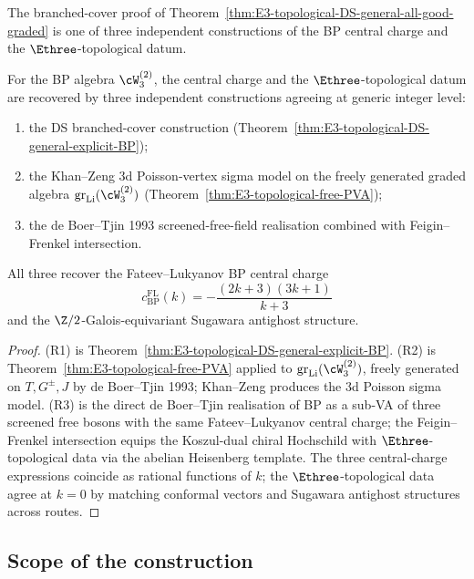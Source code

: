 The branched-cover proof of
Theorem~\ref{thm:E3-topological-DS-general-all-good-graded} is one of
three independent constructions of the BP central charge and the
$\Ethree$-topological datum.

\begin{proposition}
\label{prop:three-lane-fractional-ghost}
\ClaimStatusProvedHere{}

For the BP algebra $\cW_{3}^{(2)}$, the central charge and the
$\Ethree$-topological datum are recovered by three independent
constructions agreeing at generic integer level:
\begin{enumerate}[label=\textup{(R\arabic*)},nosep]
\item the DS branched-cover construction
 \textup{(}Theorem~\ref{thm:E3-topological-DS-general-explicit-BP}\textup{)};
\item the Khan--Zeng $3$d Poisson-vertex sigma model on the freely
 generated graded algebra
 $\operatorname{gr}_{\mathrm{Li}}(\cW_{3}^{(2)})$
 \textup{(}Theorem~\ref{thm:E3-topological-free-PVA}\textup{)};
\item the de Boer--Tjin 1993 screened-free-field realisation
 combined with Feigin--Frenkel intersection.
\end{enumerate}
All three recover the Fateev--Lukyanov BP central charge
\[
c^{\mathrm{FL}}_{\mathrm{BP}}(k)
=-\frac{(2k+3)(3k+1)}{k+3}
\]
and the
$\Z/2$-Galois-equivariant Sugawara antighost structure.
\end{proposition}

\begin{proof}
(R1) is Theorem~\ref{thm:E3-topological-DS-general-explicit-BP}.
(R2) is Theorem~\ref{thm:E3-topological-free-PVA} applied to
$\operatorname{gr}_{\mathrm{Li}}(\cW_{3}^{(2)})$, freely generated on
$T, G^{\pm}, J$ by de Boer--Tjin 1993; Khan--Zeng produces the 3d
Poisson sigma model. (R3) is the direct de Boer--Tjin realisation of
BP as a sub-VA of three screened free bosons with the same
Fateev--Lukyanov central charge; the Feigin--Frenkel intersection equips the Koszul-dual
chiral Hochschild with $\Ethree$-topological data via the abelian
Heisenberg template. The three central-charge expressions coincide
as rational functions of \(k\); the $\Ethree$-topological data agree at $k = 0$ by
matching conformal vectors and Sugawara antighost structures across
routes.
\end{proof}

\subsection{Scope of the construction}
\label{subsec:fractional-ghost-closure}

